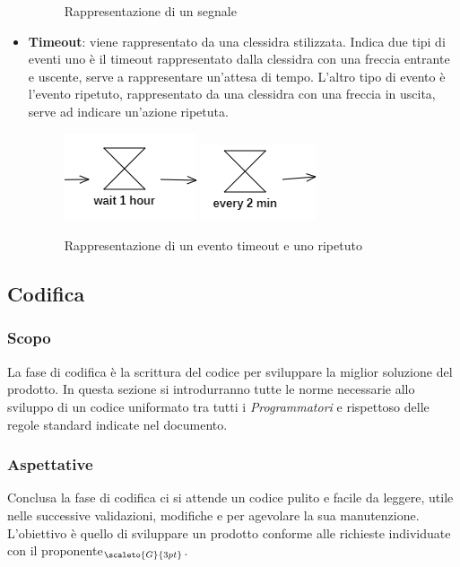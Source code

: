 \begin{itemize}
\begin{figure}[H]
		\caption{Rappresentazione di un segnale}
	\end{figure}
	\item \textbf{Timeout}: viene rappresentato da una clessidra stilizzata. Indica due tipi di eventi uno è il timeout rappresentato dalla clessidra con una freccia entrante e uscente, serve a rappresentare un'attesa di tempo. L'altro tipo di evento è l'evento ripetuto, rappresentato da una clessidra con una freccia in uscita, serve ad indicare un'azione ripetuta. %
		\begin{figure}[H]
		\centering\includegraphics{../immagini/normeUML/timeout.png}
		\centering\includegraphics{../immagini/normeUML/reapeate.png}
		\caption{Rappresentazione di un evento timeout e uno ripetuto}
	\end{figure}
\end{itemize}
\subsection{Codifica}\label{ProcessiPrimariCodifica}

\subsubsection{Scopo}\label{ProcessiPrimariCodificaScopo}
La fase di codifica è la scrittura del codice per sviluppare la miglior soluzione del prodotto. In questa sezione si introdurranno tutte le norme necessarie allo sviluppo di un codice uniformato tra tutti i \textit{Programmatori} e rispettoso delle regole standard indicate nel documento.
\subsubsection{Aspettative}\label{ProcessiPrimariCodificaAspettative}
Conclusa la fase di codifica ci si attende un codice pulito e facile da leggere, utile nelle successive validazioni, modifiche e per agevolare la sua manutenzione. L'obiettivo è quello di sviluppare un prodotto conforme alle richieste individuate con il proponente$_{\scaleto{G}{3pt}}$.


